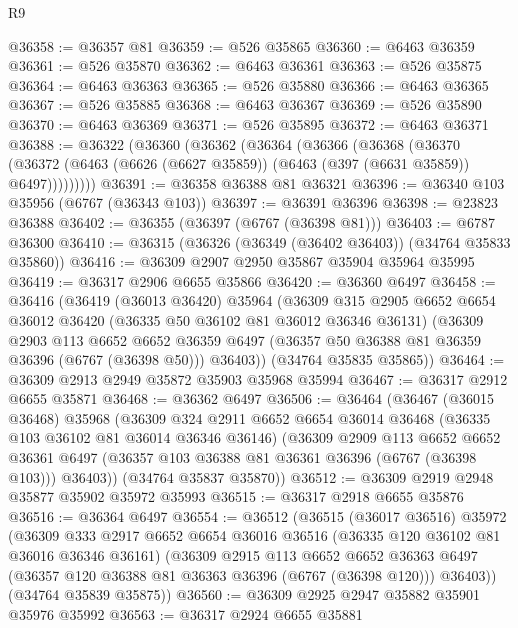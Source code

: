 \begin{lexlean}{R9}
\begin{coremodule}
@36358 := @36357 @81
@36359 := @526 @35865
@36360 := @6463 @36359
@36361 := @526 @35870
@36362 := @6463 @36361
@36363 := @526 @35875
@36364 := @6463 @36363
@36365 := @526 @35880
@36366 := @6463 @36365
@36367 := @526 @35885
@36368 := @6463 @36367
@36369 := @526 @35890
@36370 := @6463 @36369
@36371 := @526 @35895
@36372 := @6463 @36371
@36388 := @36322
    (@36360
      (@36362
        (@36364
          (@36366
            (@36368
              (@36370
                (@36372 (@6463 (@6626 (@6627 @35859)) (@6463 (@397 (@6631 @35859)) @6497)))))))))
@36391 := @36358 @36388 @81 @36321
@36396 := @36340 @103 @35956 (@6767 (@36343 @103))
@36397 := @36391 @36396
@36398 := @23823 @36388
@36402 := @36355 (@36397 (@6767 (@36398 @81)))
@36403 := @6787 @36300
@36410 := @36315 (@36326 (@36349 (@36402 @36403)) (@34764 @35833 @35860))
@36416 := @36309 @2907 @2950 @35867 @35904 @35964 @35995
@36419 := @36317 @2906 @6655 @35866
@36420 := @36360 @6497
@36458 := @36416
    (@36419
      (@36013 @36420)
      @35964
      (@36309
        @315
        @2905
        @6652
        @6654
        @36012
        @36420
        (@36335 @50 @36102 @81 @36012 @36346 @36131)
        (@36309
          @2903
          @113
          @6652
          @6652
          @36359
          @6497
          (@36357 @50 @36388 @81 @36359 @36396 (@6767 (@36398 @50)))
          @36403))
      (@34764 @35835 @35865))
@36464 := @36309 @2913 @2949 @35872 @35903 @35968 @35994
@36467 := @36317 @2912 @6655 @35871
@36468 := @36362 @6497
@36506 := @36464
    (@36467
      (@36015 @36468)
      @35968
      (@36309
        @324
        @2911
        @6652
        @6654
        @36014
        @36468
        (@36335 @103 @36102 @81 @36014 @36346 @36146)
        (@36309
          @2909
          @113
          @6652
          @6652
          @36361
          @6497
          (@36357 @103 @36388 @81 @36361 @36396 (@6767 (@36398 @103)))
          @36403))
      (@34764 @35837 @35870))
@36512 := @36309 @2919 @2948 @35877 @35902 @35972 @35993
@36515 := @36317 @2918 @6655 @35876
@36516 := @36364 @6497
@36554 := @36512
    (@36515
      (@36017 @36516)
      @35972
      (@36309
        @333
        @2917
        @6652
        @6654
        @36016
        @36516
        (@36335 @120 @36102 @81 @36016 @36346 @36161)
        (@36309
          @2915
          @113
          @6652
          @6652
          @36363
          @6497
          (@36357 @120 @36388 @81 @36363 @36396 (@6767 (@36398 @120)))
          @36403))
      (@34764 @35839 @35875))
@36560 := @36309 @2925 @2947 @35882 @35901 @35976 @35992
@36563 := @36317 @2924 @6655 @35881

\end{coremodule}
\end{lexlean}
